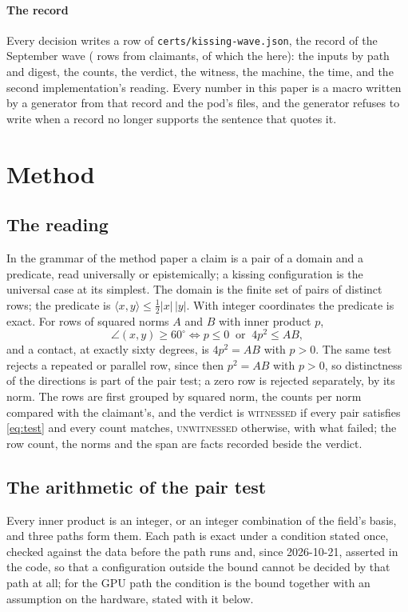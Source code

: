 \documentclass[preprint,11pt,authoryear,a4paper]{elsarticle}
\newcommand{\vword}[1]{{\normalfont\scshape #1}}
\newcommand{\vW}{\vword{witnessed}}
\begin{document}
\paragraph{The record} Every decision writes a row of \texttt{certs/kissing-wave.json}, the record of the September wave (\QkWaveRows{} rows from \QkWaveClaimants{} claimants, of which the \MtKwRows{} here): the inputs by path and digest, the counts, the verdict, the witness, the machine, the time, and the second implementation's reading. Every number in this paper is a macro written by a generator from that record and the pod's files, and the generator refuses to write when a record no longer supports the sentence that quotes it.

\section{Method}\label{sec:method}

\subsection{The reading}\label{sec:reading}
In the grammar of the method paper a claim is a pair of a domain and a predicate, read universally or epistemically; a kissing configuration is the universal case at its simplest. The domain is the finite set of pairs of distinct rows; the predicate is $\langle x,y\rangle\le\tfrac12|x|\,|y|$. With integer coordinates the predicate is exact. For rows of squared norms $A$ and $B$ with inner product $p$,
\begin{equation}\label{eq:test}
\angle(x,y)\ge60^\circ\iff p\le0\ \text{ or }\ 4p^2\le AB,
\end{equation}
and a contact, at exactly sixty degrees, is $4p^2=AB$ with $p>0$. The same test rejects a repeated or parallel row, since then $p^2=AB$ with $p>0$, so distinctness of the directions is part of the pair test; a zero row is rejected separately, by its norm. The rows are first grouped by squared norm, the counts per norm compared with the claimant's, and the verdict is \vW{} if every pair satisfies \eqref{eq:test} and every count matches, \vword{unwitnessed} otherwise, with what failed; the row count, the norms and the span are facts recorded beside the verdict.

\subsection{The arithmetic of the pair test}\label{sec:arith}
Every inner product is an integer, or an integer combination of the field's basis, and three paths form them. Each path is exact under a condition stated once, checked against the data before the path runs and, since 2026-10-21, asserted in the code, so that a configuration outside the bound cannot be decided by that path at all; for the GPU path the condition is the bound together with an assumption on the hardware, stated with it below.
\end{document}
